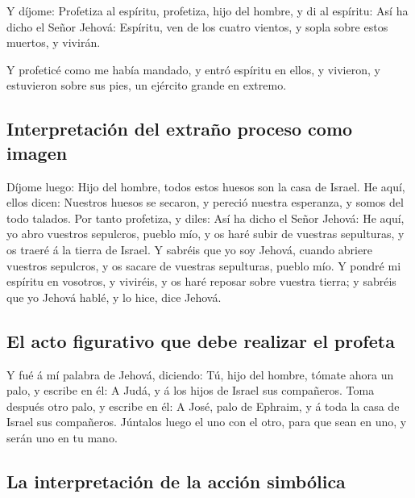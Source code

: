  Y díjome: Profetiza al espíritu, profetiza, hijo del
hombre, y di al espíritu: Así ha dicho el Señor Jehová: Espíritu, ven de
los cuatro vientos, y sopla sobre estos muertos, y vivirán.

 Y profeticé como me había mandado, y entró espíritu en
ellos, y vivieron, y estuvieron sobre sus pies, un ejército grande en
extremo.

\hypertarget{interpretaciuxf3n-del-extrauxf1o-proceso-como-imagen}{%
\subsection{Interpretación del extraño proceso como
imagen}\label{interpretaciuxf3n-del-extrauxf1o-proceso-como-imagen}}

 Díjome luego: Hijo del hombre, todos estos huesos son la
casa de Israel. He aquí, ellos dicen: Nuestros huesos se secaron, y
pereció nuestra esperanza, y somos del todo talados.  Por
tanto profetiza, y diles: Así ha dicho el Señor Jehová: He aquí, yo abro
vuestros sepulcros, pueblo mío, y os haré subir de vuestras sepulturas,
y os traeré á la tierra de Israel.  Y sabréis que yo soy
Jehová, cuando abriere vuestros sepulcros, y os sacare de vuestras
sepulturas, pueblo mío.  Y pondré mi espíritu en vosotros,
y viviréis, y os haré reposar sobre vuestra tierra; y sabréis que yo
Jehová hablé, y lo hice, dice Jehová.

\hypertarget{el-acto-figurativo-que-debe-realizar-el-profeta}{%
\subsection{El acto figurativo que debe realizar el
profeta}\label{el-acto-figurativo-que-debe-realizar-el-profeta}}

 Y fué á mí palabra de Jehová, diciendo:  Tú,
hijo del hombre, tómate ahora un palo, y escribe en él: A Judá, y á los
hijos de Israel sus compañeros. Toma después otro palo, y escribe en él:
A José, palo de Ephraim, y á toda la casa de Israel sus compañeros.
 Júntalos luego el uno con el otro, para que sean en uno, y
serán uno en tu mano.

\hypertarget{la-interpretaciuxf3n-de-la-acciuxf3n-simbuxf3lica}{%
\subsection{La interpretación de la acción
simbólica}\label{la-interpretaciuxf3n-de-la-acciuxf3n-simbuxf3lica}}

